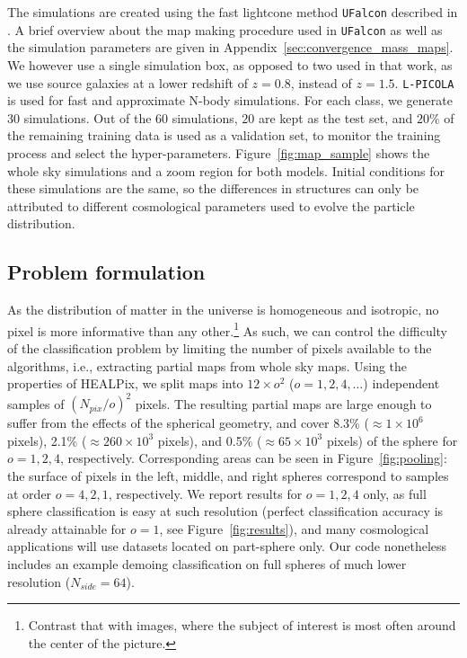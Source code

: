 \documentclass[final,twocolumn,3p,times,sort&compress]{elsarticle}
\newcommand{\figref}[1]{Figure~\ref{fig:#1}}
\newcommand{\1}{\b{1}}              %
\newcommand{\0}{\b{0}}              %
\newcommand{\pkg}[1]{\texttt{#1}}
\begin{document}
The simulations are created using the fast lightcone method \pkg{UFalcon} described in \citep{sgier2018fastgeneration}.
A brief overview about the map making procedure used in \pkg{UFalcon} as well as the simulation parameters are given in Appendix~\ref{sec:convergence_mass_maps}.
We however use a single simulation box, as opposed to two used in that work, as we use source galaxies at a lower redshift of $z=0.8$, instead of $z=1.5$.
\pkg{L-PICOLA} \citep{howlett2015lpicola} is used for fast and approximate N-body simulations.
For each class, we generate $30$ simulations.
Out of the $60$ simulations, $20$ are kept as the test set, and $20\%$ of the remaining training data is used as a validation set, to monitor the training process and select the hyper-parameters.
\figref{map_sample} shows the whole sky simulations and a zoom region for both models.
Initial conditions for these simulations are the same, so the differences in structures can only be attributed to different cosmological parameters used to evolve the particle distribution.

\subsection{Problem formulation}

As the distribution of matter in the universe is homogeneous and isotropic, no pixel is more informative than any other.\footnote{Contrast that with images, where the subject of interest is most often around the center of the picture.}
As such, we can control the difficulty of the classification problem by limiting the number of pixels available to the algorithms, i.e., extracting partial maps from whole sky maps.
Using the properties of HEALPix, we split maps into $12 \times o^2$ ($o=1,2,4,\dots$) independent samples of $(N_{pix} / o)^2$ pixels. The resulting partial maps are large enough to suffer from the effects of the spherical geometry, and cover 8.3\% ($\approx 1 \times 10^6$ pixels), 2.1\% ($\approx 260 \times 10^3$ pixels), and 0.5\% ($\approx 65 \times 10^3$ pixels) of the sphere for $o=1,2,4$, respectively.
Corresponding areas can be seen in \figref{pooling}: the surface of pixels in the left, middle, and right spheres correspond to samples at order $o=4,2,1$, respectively.
We report results for $o=1,2,4$ only, as full sphere classification is easy at such resolution (perfect classification accuracy is already attainable for $o=1$, see \figref{results}), and many cosmological applications will use datasets located on part-sphere only. Our code nonetheless includes an example demoing classification on full spheres of much lower resolution ($N_{side} = 64$).
\end{document}
